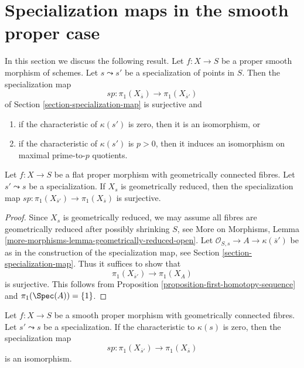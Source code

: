 \section{Specialization maps in the smooth proper case}
\label{section-specialization-smooth-proper}

\noindent
In this section we discuss the following result.
Let $f : X \to S$ be a proper smooth morphism of schemes.
Let $s \leadsto s'$ be a specialization of points in $S$.
Then the specialization map
$$
sp : \pi_1(X_{\overline{s}}) \longrightarrow \pi_1(X_{\overline{s}'})
$$
of Section \ref{section-specialization-map}
is surjective and
\begin{enumerate}
\item if the characteristic of $\kappa(s')$ is zero, then it is
an isomorphism, or
\item if the characteristic of $\kappa(s')$ is $p > 0$, then it
induces an isomorphism on maximal prime-to-$p$ quotients.
\end{enumerate}

\begin{lemma}
\label{lemma-specialization-map-surjective}
Let $f : X \to S$ be a flat proper morphism with geometrically
connected fibres. Let $s' \leadsto s$ be a specialization.
If $X_s$ is geometrically reduced, then the specialization
map $sp : \pi_1(X_{\overline{s}'}) \to \pi_1(X_{\overline{s}})$
is surjective.
\end{lemma}

\begin{proof}
Since $X_s$ is geometrically reduced, we may assume all
fibres are geometrically reduced after possibly shrinking $S$, see
More on Morphisms, Lemma \ref{more-morphisms-lemma-geometrically-reduced-open}.
Let $\mathcal{O}_{S, s} \to A \to \kappa(\overline{s}')$ be as
in the construction of the specialization map, see
Section \ref{section-specialization-map}.
Thus it suffices to show that
$$
\pi_1(X_{\overline{s}'}) \to \pi_1(X_A)
$$
is surjective. This follows from
Proposition \ref{proposition-first-homotopy-sequence}
and $\pi_1(\Spec(A)) = \{1\}$.
\end{proof}

\begin{proposition}
\label{proposition-specialization-map-isomorphism}
Let $f : X \to S$ be a smooth proper morphism with geometrically
connected fibres. Let $s' \leadsto s$ be a specialization.
If the characteristic to $\kappa(s)$ is zero, then the specialization
map
$$
sp : \pi_1(X_{\overline{s}'}) \to \pi_1(X_{\overline{s}})
$$
is an isomorphism.
\end{proposition}

